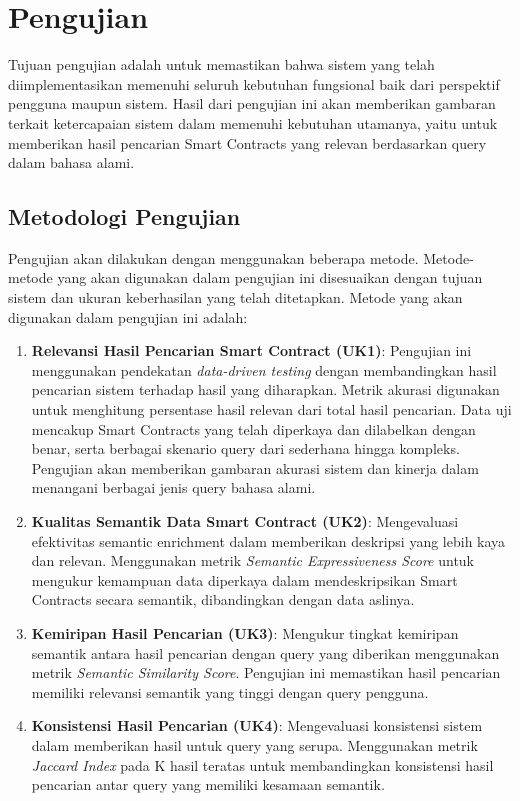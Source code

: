 \section{Pengujian}

Tujuan pengujian adalah untuk memastikan bahwa sistem yang telah diimplementasikan memenuhi seluruh kebutuhan fungsional baik dari perspektif pengguna maupun sistem. Hasil dari pengujian ini akan memberikan gambaran terkait ketercapaian sistem dalam memenuhi kebutuhan utamanya, yaitu untuk memberikan hasil pencarian Smart Contracts yang relevan berdasarkan query dalam bahasa alami.

\subsection{Metodologi Pengujian}

Pengujian akan dilakukan dengan menggunakan beberapa metode. Metode-metode yang akan digunakan dalam pengujian ini disesuaikan dengan tujuan sistem dan ukuran keberhasilan yang telah ditetapkan. Metode yang akan digunakan dalam pengujian ini adalah:

\begin{enumerate}
	\item \textbf{Relevansi Hasil Pencarian Smart Contract (UK1)}: Pengujian ini menggunakan pendekatan \textit{data-driven testing} dengan membandingkan hasil pencarian sistem terhadap hasil yang diharapkan. Metrik akurasi digunakan untuk menghitung persentase hasil relevan dari total hasil pencarian. Data uji mencakup Smart Contracts yang telah diperkaya dan dilabelkan dengan benar, serta berbagai skenario query dari sederhana hingga kompleks. Pengujian akan memberikan gambaran akurasi sistem dan kinerja dalam menangani berbagai jenis query bahasa alami.
	\item \textbf{Kualitas Semantik Data Smart Contract (UK2)}: Mengevaluasi efektivitas semantic enrichment dalam memberikan deskripsi yang lebih kaya dan relevan. Menggunakan metrik \textit{Semantic Expressiveness Score} untuk mengukur kemampuan data diperkaya dalam mendeskripsikan Smart Contracts secara semantik, dibandingkan dengan data aslinya.
	\item \textbf{Kemiripan Hasil Pencarian (UK3)}: Mengukur tingkat kemiripan semantik antara hasil pencarian dengan query yang diberikan menggunakan metrik \textit{Semantic Similarity Score}. Pengujian ini memastikan hasil pencarian memiliki relevansi semantik yang tinggi dengan query pengguna.
	\item \textbf{Konsistensi Hasil Pencarian (UK4)}: Mengevaluasi konsistensi sistem dalam memberikan hasil untuk query yang serupa. Menggunakan metrik \textit{Jaccard Index} pada K hasil teratas untuk membandingkan konsistensi hasil pencarian antar query yang memiliki kesamaan semantik.
\end{enumerate}

